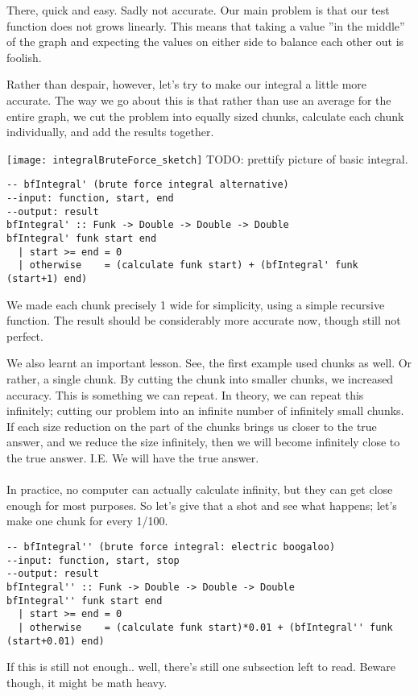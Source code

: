 There, quick and easy. Sadly not accurate. Our main problem is that our test function does not grows linearly. This means that taking a value ''in the middle'' of the graph and expecting the values on either side to balance each other out is foolish.

Rather than despair, however, let's try to make our integral a little more accurate. The way we go about this is that rather than use an average for the entire graph, we cut the problem into equally sized chunks, calculate each chunk individually, and add the results together.

\texttt{[image: integralBruteForce\_sketch]}
TODO: prettify picture of basic integral.

\begin{verbatim}
-- bfIntegral' (brute force integral alternative)
--input: function, start, end
--output: result
bfIntegral' :: Funk -> Double -> Double -> Double
bfIntegral' funk start end
  | start >= end = 0
  | otherwise    = (calculate funk start) + (bfIntegral' funk (start+1) end)
\end{verbatim}
We made each chunk precisely 1 wide for simplicity, using a simple recursive function. The result should be considerably more accurate now, though still not perfect.

We also learnt an important lesson. See, the first example used chunks as well. Or rather, a single chunk. By cutting the chunk into smaller chunks, we increased accuracy. This is something we can repeat. In theory, we can repeat this infinitely; cutting our problem into an infinite number of infinitely small chunks. If each size reduction on the part of the chunks brings us closer to the true answer, and we reduce the size infinitely, then we will become infinitely close to the true answer. I.E. We will have the true answer.

\paragraph{} In practice, no computer can actually calculate infinity, but they can get close enough for most purposes. So let's give that a shot and see what happens; let's make one chunk for every 1/100.
\begin{verbatim}
-- bfIntegral'' (brute force integral: electric boogaloo)
--input: function, start, stop
--output: result
bfIntegral'' :: Funk -> Double -> Double -> Double
bfIntegral'' funk start end
  | start >= end = 0
  | otherwise    = (calculate funk start)*0.01 + (bfIntegral'' funk (start+0.01) end)
\end{verbatim}
 If this is still not enough.. well, there's still one subsection left to read. Beware though, it might be math heavy.

